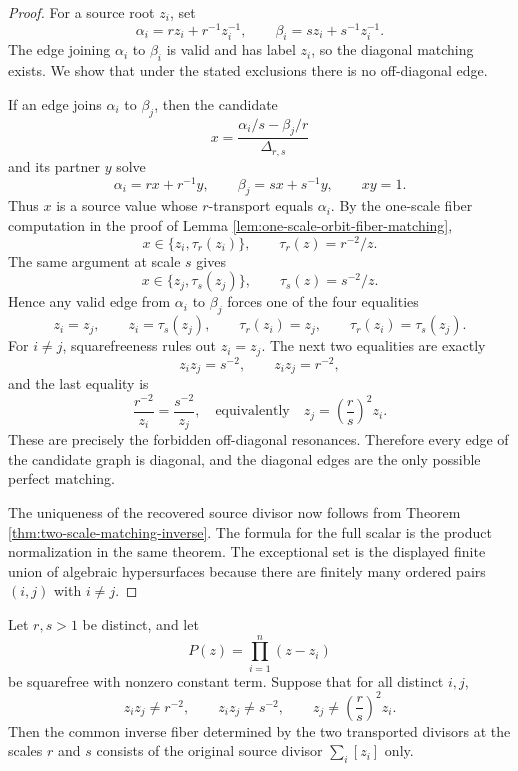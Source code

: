 \begin{proof}
For a source root \(z_i\), set
\[
\alpha_i=rz_i+r^{-1}z_i^{-1},
\qquad
\beta_i=sz_i+s^{-1}z_i^{-1}.
\]
The edge joining \(\alpha_i\) to \(\beta_i\) is valid and has label
\(z_i\), so the diagonal matching exists.  We show that under the
stated exclusions there is no off-diagonal edge.

If an edge joins \(\alpha_i\) to \(\beta_j\), then the candidate
\[
x=\frac{\alpha_i/s-\beta_j/r}{\Delta_{r,s}}
\]
and its partner \(y\) solve
\[
\alpha_i=rx+r^{-1}y,
\qquad
\beta_j=sx+s^{-1}y,
\qquad
xy=1.
\]
Thus \(x\) is a source value whose \(r\)-transport equals
\(\alpha_i\).  By the one-scale fiber computation in the proof of
Lemma \ref{lem:one-scale-orbit-fiber-matching},
\[
x\in\{z_i,\tau_r(z_i)\},
\qquad
\tau_r(z)=r^{-2}/z.
\]
The same argument at scale \(s\) gives
\[
x\in\{z_j,\tau_s(z_j)\},
\qquad
\tau_s(z)=s^{-2}/z.
\]
Hence any valid edge from \(\alpha_i\) to \(\beta_j\) forces one of the
four equalities
\[
z_i=z_j,\qquad
z_i=\tau_s(z_j),\qquad
\tau_r(z_i)=z_j,\qquad
\tau_r(z_i)=\tau_s(z_j).
\]
For \(i\ne j\), squarefreeness rules out \(z_i=z_j\).  The next two
equalities are exactly
\[
z_i z_j=s^{-2},
\qquad
z_i z_j=r^{-2},
\]
and the last equality is
\[
\frac{r^{-2}}{z_i}=\frac{s^{-2}}{z_j},
\quad\text{equivalently}\quad
z_j=\left(\frac r s\right)^2z_i .
\]
These are precisely the forbidden off-diagonal resonances.  Therefore
every edge of the candidate graph is diagonal, and the diagonal edges
are the only possible perfect matching.

The uniqueness of the recovered source divisor now follows from
Theorem \ref{thm:two-scale-matching-inverse}.  The formula for the
full scalar is the product normalization in the same theorem.  The
exceptional set is the displayed finite union of algebraic
hypersurfaces because there are finitely many ordered pairs
\((i,j)\) with \(i\ne j\).
\end{proof}

\begin{corollary}\label{cor:two-scale-nonresonance-common-fiber}
Let \(r,s>1\) be distinct, and let
\[
P(z)=\prod_{i=1}^{n}(z-z_i)
\]
be squarefree with nonzero constant term.  Suppose that for all
distinct \(i,j\),
\[
z_i z_j\ne r^{-2},\qquad
z_i z_j\ne s^{-2},\qquad
z_j\ne \left(\frac r s\right)^2 z_i .
\]
Then the common inverse fiber determined by the two transported
divisors at the scales \(r\) and \(s\) consists of the original source
divisor \(\sum_i[z_i]\) only.
\end{corollary}

